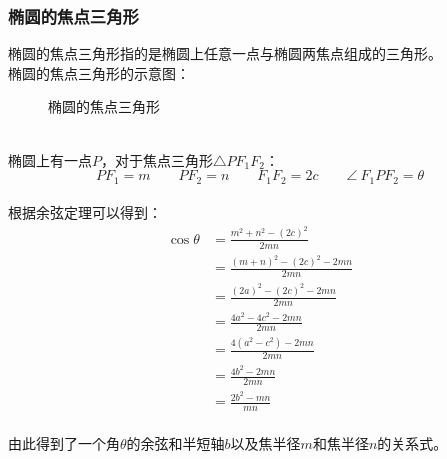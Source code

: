 \documentclass[UTF8]{ctexart}
\begin{document}
\subsubsection{椭圆的焦点三角形}
    椭圆的焦点三角形指的是椭圆上任意一点与椭圆两焦点组成的三角形。\\[3mm]
    椭圆的焦点三角形的示意图：
    \begin{figure}[h!]
        \begin{center}
            \caption{椭圆的焦点三角形}
        \end{center}
    \end{figure}\\
    椭圆上有一点$P$，对于焦点三角形$\triangle PF_1F_2$：
    \setcounter{equation}{0}
    \begin{equation}
        PF_1=m\qquad PF_2=n\qquad F_1F_2=2c\qquad \angle~ F_1PF_2=\theta
    \end{equation}\\
    根据余弦定理可以得到：
    \begin{align}
        \cos{\theta}
        &=\frac{m^2+n^2-(2c)^2}{2mn}\\[3mm]
        &=\frac{(m+n)^2-(2c)^2-2mn}{2mn}\\[3mm]
        &=\frac{(2a)^2-(2c)^2-2mn}{2mn}\\[3mm]
        &=\frac{4a^2-4c^2-2mn}{2mn}\\[3mm]
        &=\frac{4(a^2-c^2)-2mn}{2mn}\\[3mm]
        &=\frac{4b^2-2mn}{2mn}\\[3mm]
        &=\frac{2b^2-mn}{mn}
    \end{align}\\
    由此得到了一个角$\theta$的余弦和半短轴$b$以及焦半径$m$和焦半径$n$的关系式。
\end{document}
